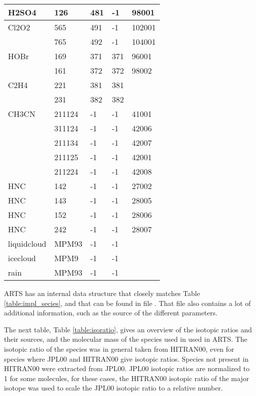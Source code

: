 \begin{longtable}{lllll}
  H2SO4& 126&  481&    -1&  98001\\
\hline                  
  Cl2O2& 565&  491&    -1&  102001\\
       & 765&  492&    -1&  104001\\
\hline                  
  HOBr & 169&  371&    371&  96001\\
       & 161&  372&    372&  98002\\
\hline                  
  C2H4 & 221&  381&    381&       \\
       & 231&  382&    382&       \\
\hline                  
CH3CN & 211124&-1 & -1    & 41001 \\
      & 311124&-1 & -1    & 42006 \\
      & 211134&-1 & -1    & 42007 \\
      & 211125&-1 & -1    & 42001 \\
      & 211224&-1 & -1    & 42008 \\
\hline                  
  HNC & 142&  -1 & -1     & 27002 \\
  HNC & 143&  -1 & -1     & 28005 \\
  HNC & 152&  -1 & -1     & 28006 \\
  HNC & 242&  -1 & -1     & 28007 \\
\hline                  
liquidcloud& MPM93&-1 &  -1   &       \\
\hline                  
icecloud& MPM9&    -1 &  -1   &       \\
\hline                  
rain     & MPM93 & -1 &  -1   &       \\
\end{longtable}
 
ARTS has an internal data structure that closely matches Table
\ref{table:impl_secies}, and that can be found in file
.  That file also contains a lot of
additional information, such as the source of the different
parameters.

The next table, Table \ref{table:isoratio}, gives an overview of the
isotopic ratios and their sources, and the molecular mass of the
species used in used in ARTS.  The isotopic ratio of the species was
in general taken from HITRAN00, even for species where JPL00 and
HITRAN00 give isotopic ratios.  Species not present in HITRAN00 were
extracted from JPL00.  JPL00 isotopic ratios are normalized to 1 for
some molecules, for these cases, the HITRAN00 isotopic ratio of the
major isotope was used to scale the JPL00 isotopic ratio to a relative
number.


